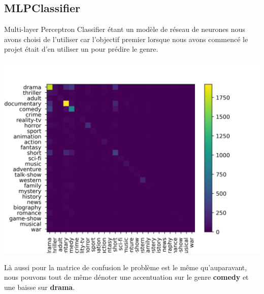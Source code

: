 \newpage
\subsection{MLPClassifier}

Multi-layer Perceptron Classifier étant un modèle de réseau de neurones nous avons choisi de l'utiliser car l'objectif premier lorsque nous avons commencé le projet était d'en utiliser un pour prédire le genre.

\begin{center}
    \includegraphics[scale=1]{graphs/confusion_matrix_MLPClassifier(hidden_layer_sizes=(46,)).png}
\end{center}

Là aussi pour la matrice de confusion le problème est le même qu'auparavant, nous pouvons tout de même dénoter une accentuation sur le genre \textbf{comedy} et une baisse sur \textbf{drama}.